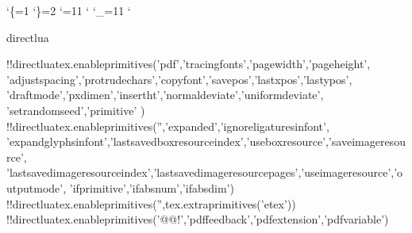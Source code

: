 
\catcode`\{=1
\catcode`\}=2
\catcode`\@=11
\catcode`
\catcode`\_=11
\catcode`

\let\@@!directlua\directlua \let\directlua\undefined

\@@!directlua{tex.enableprimitives('pdf',{'tracingfonts','pagewidth','pageheight',
'adjustspacing','protrudechars','copyfont','savepos','lastxpos','lastypos',
'draftmode','pxdimen','insertht','normaldeviate','uniformdeviate', 'setrandomseed','primitive'
})}
\@@!directlua{tex.enableprimitives('',{'expanded','ignoreligaturesinfont',
'expandglyphsinfont','lastsavedboxresourceindex','useboxresource','saveimageresource',
'lastsavedimageresourceindex','lastsavedimageresourcepages','useimageresource','outputmode',
'ifprimitive','ifabsnum','ifabsdim'})}
\@@!directlua{tex.enableprimitives('',tex.extraprimitives('etex'))}
\@@!directlua{tex.enableprimitives('@@!',{'pdffeedback','pdfextension','pdfvariable'})}



\let\pdfnoligatures     \ignoreligaturesinfont       \let\ignoreligaturesinfont\undefined
\let\pdffontexpand      \expandglyphsinfont          \let\expandglyphsinfont\undefined
\let\pdfxform           \saveboxresource             \let\saveboxresource\undefined
\let\pdflastxform       \lastsavedboxresourceindex   \let\lastsavedboxresourceindex\undefined
\let\pdfrefxform        \useboxresource              \let\useboxresource\undefined
\let\pdfximage          \saveimageresource           \let\saveimageresource\undefined
\let\pdflastximage      \lastsavedimageresourceindex \let\lastsavedimageresourceindex\undefined
\let\pdflastximagepages \lastsavedimageresourcepages \let\lastsavedimageresourcepages\undefined
\let\pdfrefximage       \useimageresource            \let\useimageresource\undefined

\let\pdfoutput          \outputmode                  \let\outputmode\undefined

